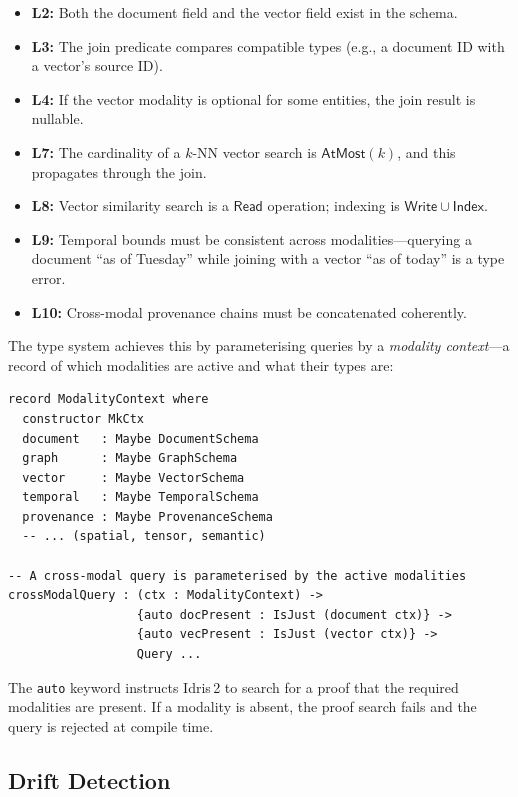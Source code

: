 \documentclass[11pt,a4paper]{article}
\begin{document}
\begin{itemize}[nosep]
  \item \textbf{L2:} Both the document field and the vector field
    exist in the schema.
  \item \textbf{L3:} The join predicate compares compatible types
    (e.g., a document ID with a vector's source ID).
  \item \textbf{L4:} If the vector modality is optional for some
    entities, the join result is nullable.
  \item \textbf{L7:} The cardinality of a $k$-NN vector search
    is $\mathsf{AtMost}(k)$, and this propagates through the join.
  \item \textbf{L8:} Vector similarity search is a $\mathsf{Read}$
    operation; indexing is $\mathsf{Write} \cup \mathsf{Index}$.
  \item \textbf{L9:} Temporal bounds must be consistent across
    modalities---querying a document ``as of Tuesday'' while joining
    with a vector ``as of today'' is a type error.
  \item \textbf{L10:} Cross-modal provenance chains must be
    concatenated coherently.
\end{itemize}

The type system achieves this by parameterising queries by a
\emph{modality context}---a record of which modalities are active
and what their types are:

\begin{lstlisting}[language=Idris2]
record ModalityContext where
  constructor MkCtx
  document   : Maybe DocumentSchema
  graph      : Maybe GraphSchema
  vector     : Maybe VectorSchema
  temporal   : Maybe TemporalSchema
  provenance : Maybe ProvenanceSchema
  -- ... (spatial, tensor, semantic)

-- A cross-modal query is parameterised by the active modalities
crossModalQuery : (ctx : ModalityContext) ->
                  {auto docPresent : IsJust (document ctx)} ->
                  {auto vecPresent : IsJust (vector ctx)} ->
                  Query ...
\end{lstlisting}

The \texttt{auto} keyword instructs Idris\,2 to search for a proof
that the required modalities are present.  If a modality is absent,
the proof search fails and the query is rejected at compile time.

\subsection{Drift Detection}
\end{document}
